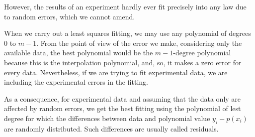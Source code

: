 \begin{paracol}{2}
However, the results of an experiment hardly ever fit precisely into any law due to random errors, which we cannot amend.

When we carry out a least squares fitting, we may use any polynomial of degrees 0 to $m-1$. From the point of view of the error we make, considering only the available data, the best polynomial would be the $m-1$-degree polynomial because this is the interpolation polynomial, and, so, it makes a zero error for every data. Nevertheless, if we are trying to fit experimental data, we are including the experimental errors in the fitting.

As a consequence, for experimental data and assuming that the data only are affected by random errors, we get the best fitting using the polynomial of lest degree for which the differences between data and polynomial value $y_i-p(x_i)$ are randomly distributed. Such differences are usually called residuals. 
\end{paracol}

